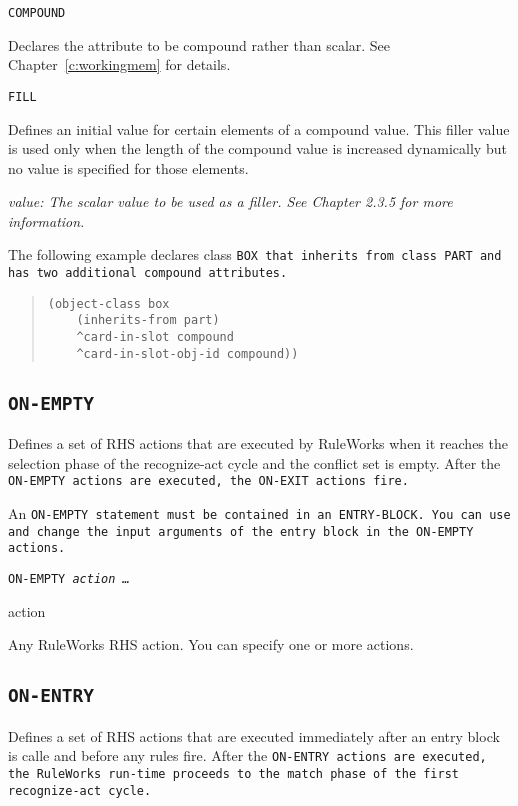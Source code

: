 {{\tt{COMPOUND}

Declares the attribute to be compound rather than scalar. See
Chapter~\ref{c:workingmem} for details.

\tt{FILL}

Defines an initial value for certain elements of a compound
value. This filler value is used only when the length of the compound
value is increased dynamically but no value is specified for those
elements.

\it{value}: The scalar value to be used as a filler. See Chapter 2.3.5
for more information.

\Example

The following example declares class \tt{BOX} that inherits from
class \tt{PART} and has two additional compound attributes.

\begin{quote}
\begin{verbatim}
(object-class box
    (inherits-from part)
    ^card-in-slot compound
    ^card-in-slot-obj-id compound))
\end{verbatim}
\end{quote}

\subsection{\tt{ON-EMPTY}}

Defines a set of RHS actions that are executed by RuleWorks
when it reaches the selection phase of the recognize-act
cycle and the conflict set is empty. After the \tt{ON-EMPTY}
actions are executed, the \tt{ON-EXIT} actions fire.

An \tt{ON-EMPTY} statement must be contained in an \tt{ENTRY-BLOCK}.
You can use and change the input arguments of the entry block
in the \tt{ON-EMPTY} actions.

\Format

\tt{ON-EMPTY} \it{action} \ldots

\begin{arguments}
\item[action]

  Any RuleWorks RHS action. You can specify one or more actions.
\end{arguments}

\subsection{\tt{ON-ENTRY}}

Defines a set of RHS actions that are executed immediately
after an entry block is calle and before any rules fire.
After the \tt{ON-ENTRY} actions are executed, the RuleWorks
run-time proceeds to the match phase of the first
recognize-act cycle.

}}
